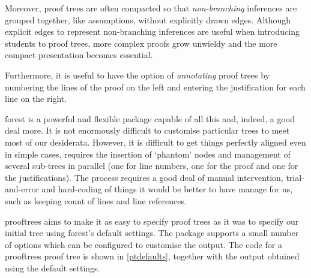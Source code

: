 \documentclass[10pt,british,a4paper,doc2]{ltxdoc}
\newcommand*\pkg[1]{\textsf{#1}}
\begin{document}
Moreover, proof trees are often compacted so that \emph{non-branching} inferences are grouped together, like assumptions, without explicitly drawn edges.
Although explicit edges to represent non-branching inferences are useful when introducing students to proof trees, more complex proofs grow unwieldy and the more compact presentation becomes essential.

Furthermore, it is useful to have the option of \emph{annotating} proof trees by numbering the lines of the proof on the left and entering the justification for each line on the right.

\pkg{forest} is a powerful and flexible package capable of all this and, indeed, a good deal more.
It is not enormously difficult to customise particular trees to meet most of our desiderata.
However, it is difficult to get things perfectly aligned even in simple cases, requires the insertion of ‘phantom’ nodes and management of several sub-trees in parallel (one for line numbers, one for the proof and one for the justifications).
The process requires a good deal of manual intervention, trial-and-error and hard-coding of things it would be better to have \LaTeXe{} manage for us, such as keeping count of lines and line references.

\pkg{prooftrees} aims to make it as easy to specify proof trees as it was to specify our initial tree using \pkg{forest}'s default settings.
The package supports a small number of options which can be configured to customise the output.
The code for a \pkg{prooftrees} proof tree is shown in \cref{ptdefaults}, together with the output obtained using the default settings.
\end{document}
